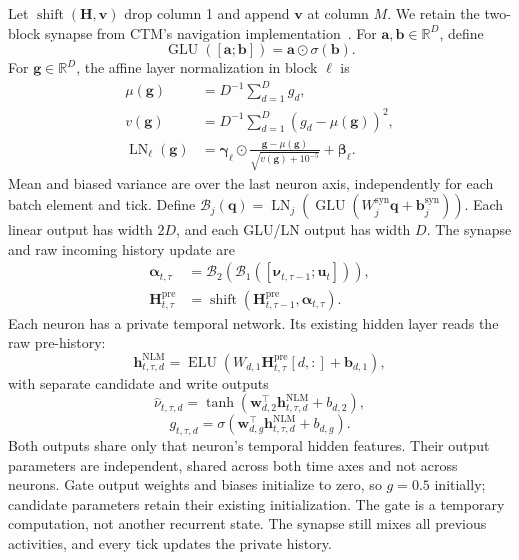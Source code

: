 \documentclass{article}
\begin{document}
Let $\operatorname{shift}(\mathbf H,\mathbf v)$ drop column 1 and append $\mathbf v$ at column $M$. We retain the two-block synapse from CTM's navigation implementation~\cite{darlow2025continuous}. For $\mathbf a,\mathbf b\in\mathbb R^D$, define
\begin{equation}
\operatorname{GLU}([\mathbf a;\mathbf b])=\mathbf a\odot\sigma(\mathbf b).
\label{eq:ct_synapse_glu}
\end{equation}
For $\mathbf g\in\mathbb R^D$, the affine layer normalization in block $\ell$ is
\begin{equation}
\begin{aligned}
\mu(\mathbf g)&=D^{-1}\sum_{d=1}^D g_d,\\
v(\mathbf g)&=D^{-1}\sum_{d=1}^D(g_d-\mu(\mathbf g))^2,\\
\operatorname{LN}_{\ell}(\mathbf g)&=\boldsymbol\gamma_{\ell}\odot
\frac{\mathbf g-\mu(\mathbf g)}{\sqrt{v(\mathbf g)+10^{-5}}}
+\boldsymbol\beta_{\ell}.
\end{aligned}
\label{eq:ct_synapse_layernorm}
\end{equation}
Mean and biased variance are over the last neuron axis, independently for each batch element and tick. Define $\mathcal B_j(\mathbf q)=\operatorname{LN}_j(\operatorname{GLU}(W_j^{\mathrm{syn}}\mathbf q+\mathbf b_j^{\mathrm{syn}}))$. Each linear output has width $2D$, and each GLU/LN output has width $D$. The synapse and raw incoming history update are
\begin{align}
\boldsymbol\alpha_{t,\tau}&=\mathcal B_2\!\left(\mathcal B_1
([\boldsymbol\nu_{t,\tau-1};\mathbf u_t])\right),
\label{eq:ct_synapse_tick}\\
\mathbf H_{t,\tau}^{\mathrm{pre}}&=\operatorname{shift}
(\mathbf H_{t,\tau-1}^{\mathrm{pre}},\boldsymbol\alpha_{t,\tau}).
\label{eq:ct_pre_history}
\end{align}
Each neuron has a private temporal network. Its existing hidden layer reads the raw pre-history:
\begin{equation}
\mathbf h^{\mathrm{NLM}}_{t,\tau,d}=\operatorname{ELU}
(W_{d,1}\mathbf H_{t,\tau}^{\mathrm{pre}}[d,:]+\mathbf b_{d,1}),
\label{eq:ct_neuron_model}
\end{equation}
with separate candidate and write outputs
\begin{equation}
\widehat\nu_{t,\tau,d}=\tanh\!\left(
\mathbf w_{d,2}^{\top}\mathbf h^{\mathrm{NLM}}_{t,\tau,d}+b_{d,2}\right),
\label{eq:private_nlm}
\end{equation}
\begin{equation}
g_{t,\tau,d}=\sigma\!\left(
\mathbf w_{d,g}^{\top}\mathbf h^{\mathrm{NLM}}_{t,\tau,d}+b_{d,g}\right).
\label{eq:ct_write_gate}
\end{equation}
Both outputs share only that neuron's temporal hidden features. Their output parameters are independent, shared across both time axes and not across neurons. Gate output weights and biases initialize to zero, so $g=0.5$ initially; candidate parameters retain their existing initialization. The gate is a temporary computation, not another recurrent state. The synapse still mixes all previous activities, and every tick updates the private history.
\end{document}
